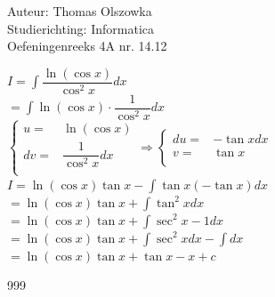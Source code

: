 \documentclass[a4paper]{article}
\newcommand{\dint}{\displaystyle\int}
\begin{document}
\noindent \large Auteur: Thomas Olszowka \\
\noindent \large Studierichting: Informatica \\
\noindent \large Oefeningenreeks 4A nr. 14.12  \\



\medskip

\normalsize

$I = \dint \dfrac{\ln(\cos x)}{\cos^2 x} dx$ \\

$= \dint \ln(\cos x) \cdot \dfrac{1}{\cos^2 x}  dx$ \\

$\left\{\begin{array}{cc}
    u =& \ln(\cos x) \\ 
    dv =& \dfrac{1}{\cos^2 x} dx \\ 
\end{array}\right. \Rightarrow\left\{\begin{array}{cc}
    du =& - \tan x dx \\
    v =& \tan x \\ 
\end{array}\right.$ \\

$I = \ln(\cos x) \tan x - \dint \tan x(- \tan x) dx$ \\

$= \ln(\cos x) \tan x + \dint \tan^2 x dx$ \\

$= \ln(\cos x) \tan x + \dint \sec^2 x -1 dx$ \\

$= \ln(\cos x) \tan x + \dint \sec^2 x dx - \dint dx$ \\

$= \ln(\cos x) \tan x + \tan x - x + c$ \\

\begin{thebibliography}{999}
\end{thebibliography}
\end{document}
